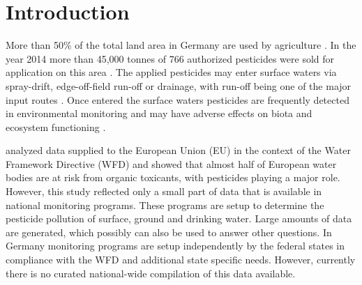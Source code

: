 \documentclass[journal=esthag,manuscript=article]{achemso}
\begin{document}
\section{Introduction}

More than 50\% of the total land area in Germany are used by agriculture \citep{statistisches_bundesamt_bodenflache_2014}.
In the year 2014 more than 45,000 tonnes of 766 authorized pesticides were sold for application on this area \citep{bundesamt_fur_verbraucherschutz_und_lebensmittelsicherheit_absatz_2015}.
The applied pesticides may enter surface waters via spray-drift, edge-off-field run-off or drainage, with run-off being one of the major input routes \citep{schulz_comparison_2001,liess_determination_1999}.
%
%
Once entered the surface waters pesticides are frequently detected in environmental monitoring \citep{malaj_organic_2014} and may have adverse effects on biota and ecosystem functioning \citep{schulz_field_2004, schafer_effects_2007}.
%
%
%
%

\citet{malaj_organic_2014} analyzed data supplied to the European Union (EU) in the context of the Water Framework Directive (WFD) and showed that almost half of European water bodies are at risk from organic toxicants, with pesticides playing a major role.
However, this study reflected only a small part of data that is available in national monitoring programs.
These programs are setup to determine the pesticide pollution of surface, ground and drinking water.
%
%
Large amounts of data are generated, which possibly can also be used to answer other questions.
In Germany monitoring programs are setup independently by the federal states in compliance with the WFD \citep{quevauviller_water_2008} and additional state specific needs.
However, currently there is no curated national-wide compilation of this data available.
%
%
\end{document}
